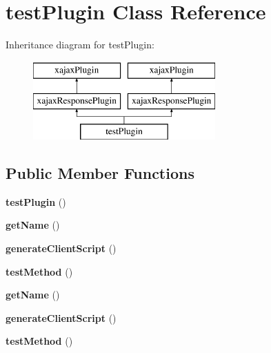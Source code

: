 \hypertarget{classtestPlugin}{
\section{testPlugin Class Reference}
\label{classtestPlugin}
}
Inheritance diagram for testPlugin:\begin{figure}[H]
\begin{center}
\leavevmode
\includegraphics[height=3.000000cm]{classtestPlugin}
\end{center}
\end{figure}
\subsection*{Public Member Functions}
\begin{DoxyCompactItemize}
\item 
\hypertarget{classtestPlugin_a8568d6b5963b38df4f24ea3eea2c4ce4}{
{\bfseries testPlugin} ()}
\label{classtestPlugin_a8568d6b5963b38df4f24ea3eea2c4ce4}

\item 
\hypertarget{classtestPlugin_a6a782adbb8e66e059baf0df10510b188}{
{\bfseries getName} ()}
\label{classtestPlugin_a6a782adbb8e66e059baf0df10510b188}

\item 
\hypertarget{classtestPlugin_ac57f05c3a9bdcd8b91137ba02fb81309}{
{\bfseries generateClientScript} ()}
\label{classtestPlugin_ac57f05c3a9bdcd8b91137ba02fb81309}

\item 
\hypertarget{classtestPlugin_a2ce894ca48e078ff60183c7896b93f7a}{
{\bfseries testMethod} ()}
\label{classtestPlugin_a2ce894ca48e078ff60183c7896b93f7a}

\item 
\hypertarget{classtestPlugin_a6a782adbb8e66e059baf0df10510b188}{
{\bfseries getName} ()}
\label{classtestPlugin_a6a782adbb8e66e059baf0df10510b188}

\item 
\hypertarget{classtestPlugin_ac57f05c3a9bdcd8b91137ba02fb81309}{
{\bfseries generateClientScript} ()}
\label{classtestPlugin_ac57f05c3a9bdcd8b91137ba02fb81309}

\item 
\hypertarget{classtestPlugin_a2ce894ca48e078ff60183c7896b93f7a}{
{\bfseries testMethod} ()}
\label{classtestPlugin_a2ce894ca48e078ff60183c7896b93f7a}

\end{DoxyCompactItemize}
